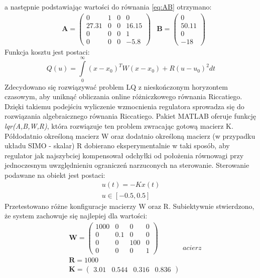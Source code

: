 a następnie podstawiając wartości do równania \ref{eq:AB} otrzymano:
\begin{equation}
\label{eq:ABwar}
\begin{aligned}
&\mathbf{A} =
\left( \begin{array}{cccc}
0 & 1 & 0 & 0 \\
27.31 & 0 & 0 & 16.15 \\
0 & 0 & 0 & 1 \\
0 & 0 & 0 & -5.8
\end{array} \right)
&\mathbf{B} =
\left( \begin{array}{cccc}
0 \\
50.11 \\
0 \\
-18
\end{array} \right)
\end{aligned}
\end{equation}
Funkcja kosztu jest postaci:
\begin{equation}
Q(u) = \int\limits_{0}^{\infty}  \left( x-x_{0}\right)^TW\left( x-x_{0}\right) + R\left( u-u_{0}\right)^2  dt
\label{eq:cost}  
\end{equation}
Zdecydowano się rozwiązywać problem LQ z nieskończonym horyzontem czasowym, aby uniknąć obliczania online różniczkowego równania Riccatiego. Dzięki takiemu podejściu wyliczenie wzmocnienia regulatora sprowadza się do rozwiązania algebraicznego równania Riccatiego. Pakiet MATLAB oferuje funkcję \textit{lqr(A,B,W,R)}, która rozwiązuje ten problem zwracając gotową macierz K. Półdodatnio określoną macierz W oraz dodatnio określoną macierz (w przypadku układu SIMO - skalar) R dobierano eksperymentalnie w taki sposób, aby regulator jak najszybciej kompensował odchyłki od położenia równowagi przy jednoczesnym uwzględnieniu ograniczeń narzuconych na sterowanie. Sterowanie podawane na obiekt jest postaci:
\begin{eqnarray}
\label{eq:u}
u(t) = -Kx(t)\\
u\in[-0.5, 0.5]    
\end{eqnarray}
Przetestowano różne konfiguracje macierzy W oraz R. Subiektywnie stwierdzono, że system zachowuje się najlepiej dla wartości:
\begin{equation}
\begin{aligned}
&\mathbf{W} =
\left( \begin{array}{cccc}
1000 & 0 & 0 & 0 \\
0 & 0.1 & 0 & 0 \\
0 & 0 & 100 & 0 \\
0 & 0 & 0 & 1
\end{array} \right)\\
&\mathbf{R} = 1000\\
&\mathbf{K} = 
\left( \begin{array}{cccc}
3.01 & 0.544 & 0.316 & 0.836
\end{array} \right)
\end{aligned}
acierz\end{equation}

